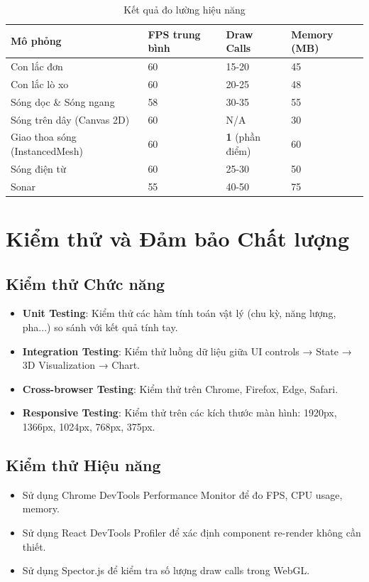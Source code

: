 \begin{table}[H]
\centering
\caption{Kết quả đo lường hiệu năng}
\begin{tabular}{|p{}|p{}|p{}|p{}|}
\hline
\textbf{Mô phỏng} & \textbf{FPS trung bình} & \textbf{Draw Calls} & \textbf{Memory (MB)} \\
\hline
Con lắc đơn & 60 & 15-20 & 45 \\
Con lắc lò xo & 60 & 20-25 & 48 \\
Sóng dọc \& Sóng ngang & 58 & 30-35 & 55 \\
Sóng trên dây (Canvas 2D) & 60 & N/A & 30 \\
Giao thoa sóng (InstancedMesh) & 60 & \textbf{1} (phần điểm) & 60 \\
Sóng điện từ & 60 & 25-30 & 50 \\
Sonar & 55 & 40-50 & 75 \\
\hline
\end{tabular}
\end{table}

\section{Kiểm thử và Đảm bảo Chất lượng}

\subsection{Kiểm thử Chức năng}

\begin{itemize}
    \item \textbf{Unit Testing}: Kiểm thử các hàm tính toán vật lý (chu kỳ, năng lượng, pha...) so sánh với kết quả tính tay.
    \item \textbf{Integration Testing}: Kiểm thử luồng dữ liệu giữa UI controls → State → 3D Visualization → Chart.
    \item \textbf{Cross-browser Testing}: Kiểm thử trên Chrome, Firefox, Edge, Safari.
    \item \textbf{Responsive Testing}: Kiểm thử trên các kích thước màn hình: 1920px, 1366px, 1024px, 768px, 375px.
\end{itemize}

\subsection{Kiểm thử Hiệu năng}

\begin{itemize}
    \item Sử dụng Chrome DevTools Performance Monitor để đo FPS, CPU usage, memory.
    \item Sử dụng React DevTools Profiler để xác định component re-render không cần thiết.
    \item Sử dụng Spector.js để kiểm tra số lượng draw calls trong WebGL.
\end{itemize}

